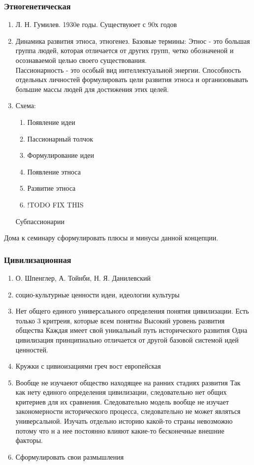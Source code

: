 \documentclass[a4paper]{article}
\begin{document}
\subsubsection{Этногенетическая}
\begin{enumerate}
\item Л. Н. Гумилев. 1930е годы. Существуюет с 90х годов
\item Динамика развития этноса, этногенез. Базовые термины:
    Этнос - это большая группа людей, которая отличается от других групп, четко обозначеной и осознаваемой целью своего существования. \\
    Пассионарность - это особый вид интеллектуальной энергии. Способность отдельных личностей формулировать цели развития этноса и организовывать большие массы людей для достижения этих целей.
\item Схема:
    \begin{enumerate}
        \item Появление идеи 
        \item Пассионарный толчок
        \item Формулирование идеи 
        \item Появление этноса 
        \item Развитие этноса 
        \item !TODO FIX THIS
    \end{enumerate}
    Субпассионарии 
\end{enumerate}

Дома к семинару сформулировать плюсы и минусы данной концепции.

\subsubsection{Цивилизационная}
\begin{enumerate}
    \item О. Шпенглер, А. Тойнби, Н. Я. Данилевский
    \item социо-культурные ценности идеи, идеологии культуры
    \item Нет общего единого универсального определения понятия цивилизации. Есть только 3 критреия, которые всем понятны
    Высокий уровень развития общества
    Каждая имеет свой уникальный путь исторического развития
    Одна цивилизация принципиально отличается от другой базовой системой идей ценностей.
    \item Кружки с цивиоизациями греч вост европейская
    \item Вообще не изучаеют общество находящее на ранних стадиях развития
    Так как нету единого определения цивилизации, следовательно нет общих критериев для их сравнения. Следовательно модель вообще не изучает закономерности исторического процесса, следовательно не может являться универсальной.
    Изучать отдельно историю какой-то страны невозможно потому что н а нее постоянно влияют какие-то бесконечные внешние факторы.
    \item Сформулировать свои размышления
\end{enumerate}
\end{document}
